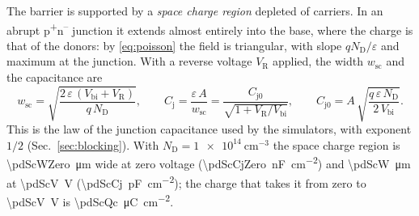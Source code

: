 \documentclass[10pt,a4paper]{scrartcl}
\newcommand{\VR}{V_\mathrm{R}}
\newcommand{\Cj}{C_\mathrm{j}}
\newcommand{\Cjo}{C_\mathrm{j0}}
\newcommand{\ND}{N_\mathrm{D}}
\newcommand{\wsc}{w_\mathrm{sc}}
\newcommand{\Vbi}{V_\mathrm{bi}}
\newcommand{\Pp}{p\textsuperscript{+}}
\newcommand{\Nm}{n\textsuperscript{--}}
\begin{document}
The barrier is supported by a \emph{space charge region} depleted of carriers. In an abrupt \Pp\Nm{} junction it extends almost entirely into the base, where the charge is that of the donors: by \eqref{eq:poisson} the field is triangular, with slope $q\ND/\varepsilon$ and maximum at the junction. With a reverse voltage $\VR$ applied, the width $\wsc$ and the capacitance are
\begin{equation}
\wsc = \sqrt{\frac{2\,\varepsilon\,(\Vbi + \VR)}{q\,\ND}} , \qquad
\Cj = \frac{\varepsilon\,A}{\wsc} = \frac{\Cjo}{\sqrt{1 + \VR/\Vbi}} , \qquad \Cjo = A\,\sqrt{\frac{q\,\varepsilon\,\ND}{2\,\Vbi}} .
\label{eq:wsc}
\end{equation}
This is the law of the junction capacitance used by the simulators, with exponent $1/2$ (Sec.~\ref{sec:blocking}). With $\ND = \SI{1e14}{\centi\metre^{-3}}$ the space charge region is \SI{\pdScWZero}{\micro\metre} wide at zero voltage (\SI{\pdScCjZero}{\nano\farad\per\centi\metre\squared}) and \SI{\pdScW}{\micro\metre} at \SI{\pdScV}{\volt} (\SI{\pdScCj}{\pico\farad\per\centi\metre\squared}); the charge that takes it from zero to \SI{\pdScV}{\volt} is \SI{\pdScQc}{\micro\coulomb\per\centi\metre\squared}.
\end{document}
